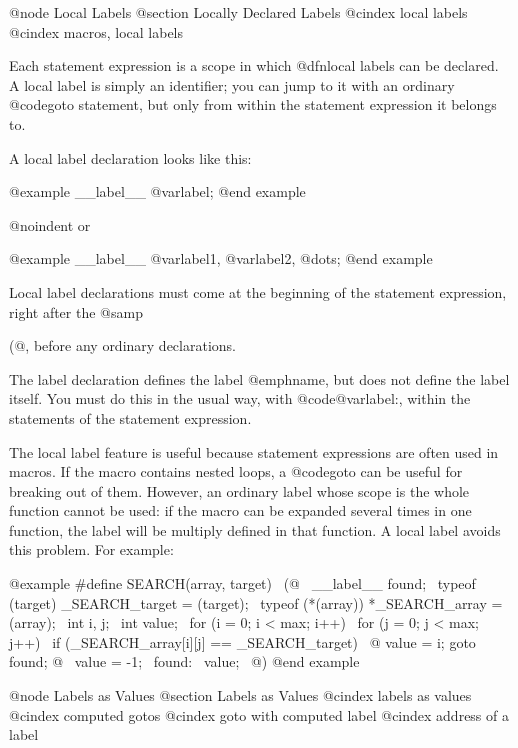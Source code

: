@node Local Labels
@section Locally Declared Labels
@cindex local labels
@cindex macros, local labels

Each statement expression is a scope in which @dfn{local labels} can be
declared.  A local label is simply an identifier; you can jump to it
with an ordinary @code{goto} statement, but only from within the
statement expression it belongs to.

A local label declaration looks like this:

@example
__label__ @var{label};
@end example

@noindent
or

@example
__label__ @var{label1}, @var{label2}, @dots{};
@end example

Local label declarations must come at the beginning of the statement
expression, right after the @samp{(@{}, before any ordinary
declarations.

The label declaration defines the label @emph{name}, but does not define
the label itself.  You must do this in the usual way, with
@code{@var{label}:}, within the statements of the statement expression.

The local label feature is useful because statement expressions are
often used in macros.  If the macro contains nested loops, a @code{goto}
can be useful for breaking out of them.  However, an ordinary label
whose scope is the whole function cannot be used: if the macro can be
expanded several times in one function, the label will be multiply
defined in that function.  A local label avoids this problem.  For
example:

@example
#define SEARCH(array, target)                     \
(@{                                               \
  __label__ found;                                \
  typeof (target) _SEARCH_target = (target);      \
  typeof (*(array)) *_SEARCH_array = (array);     \
  int i, j;                                       \
  int value;                                      \
  for (i = 0; i < max; i++)                       \
    for (j = 0; j < max; j++)                     \
      if (_SEARCH_array[i][j] == _SEARCH_target)  \
        @{ value = i; goto found; @}              \
  value = -1;                                     \
 found:                                           \
  value;                                          \
@})
@end example

@node Labels as Values
@section Labels as Values
@cindex labels as values
@cindex computed gotos
@cindex goto with computed label 
@cindex address of a label

}
